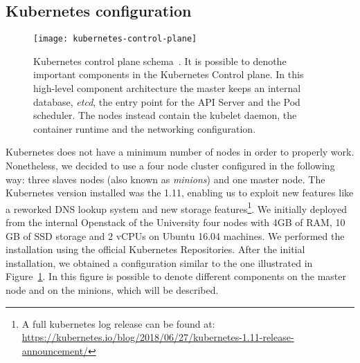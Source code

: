 \subsection{Kubernetes configuration}

\begin{figure}[t]
  \centering
  \texttt{[image: kubernetes-control-plane]}
  \caption[Kubernetes control plane schema]{Kubernetes control plane
    schema~\cite{k8scp}. It is possible to denothe important components in the
    Kubernetes Control plane. In this high-level component architecture the
    master keeps an internal database, \emph{etcd}, the entry point for the API
    Server and the Pod scheduler. The nodes instead contain the kubelet daemon,
    the container runtime and the networking configuration.}
  \label{chap:archimpl:sec:secondattempt:img:k8scp}
\end{figure}

Kubernetes does not have a minimum number of nodes in order to properly work.
Nonetheless, we decided to use a four node cluster configured in the following
way: three slaves nodes (also known as \emph{minions}) and one master node. The
Kubernetes version installed was the 1.11, enabling us to exploit new features
like a reworked DNS lookup system and new storage features\footnote{A full
  kubernetes log release can be found at:
  \url{https://kubernetes.io/blog/2018/06/27/kubernetes-1.11-release-announcement/}}.
We initially deployed from the internal Openstack of the University four nodes
with 4GB of RAM, 10 GB of SSD storage and 2 vCPUs on Ubuntu 16.04 machines. We
performed the installation using the official Kubernetes Repositories. After the
initial installation, we obtained a configuration similar to the one illustrated
in Figure~\ref{chap:archimpl:sec:secondattempt:img:k8scp}. In this figure is
possible to denote different components on the master node and on the minions,
which will be described.

